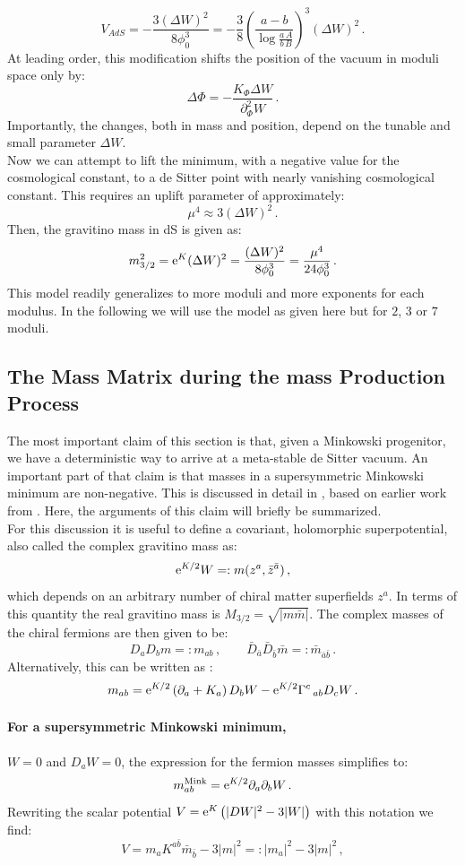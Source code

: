 \documentclass[a4paper,12pt]{report}
\newcommand{\be}{\begin{equation}}
\newcommand{\ee}{\end{equation}}
\def\rme{{\rm e}}
\begin{document}
\be 
V_{AdS} = - \frac{3(\Delta W)^2}{8 \phi_0^3} = -\frac{3}{8} \left(\frac{a-b}{\log \frac{a\, A}{b\,B}}\right)^3 (\Delta W)^2\,.
\ee
At leading order, this modification shifts the position of the vacuum in moduli space only by:
\be 
\Delta \Phi = - \frac{K_\Phi \Delta W}{\partial_\Phi^2 W}\,.
\ee
Importantly, the changes, both in mass and position, depend on the tunable and small parameter $\Delta W$.\\
Now we can attempt to lift the minimum, with a negative value for the cosmological constant, to a de Sitter point with nearly vanishing cosmological constant. This requires an uplift parameter of approximately:
\be 
\mu^4 \approx 3 (\Delta W)^2\,.
\ee
Then, the gravitino mass in dS is given as:
\be 
m_{3/2}^2 = \rme^K (\Delta W)^2 = \frac{(\Delta W)^2}{8 \phi_0^3} =  \frac{\mu^4}{24\phi_0^3}\,.
\ee
This model readily generalizes to more moduli and more exponents for each modulus. In the following we will use the model as given here but for $2$, $3$ or $7$ moduli.

\subsection{The Mass Matrix during the mass Production Process}
\label{sec:massmass}
The most important claim of this section is that, given a Minkowski progenitor, we have a deterministic way to arrive at a meta-stable de Sitter vacuum. An important part of that claim is that masses in a supersymmetric Minkowski minimum are non-negative. This is discussed in detail in \cite{Kallosh:2019zgd}, based on earlier work from \cite{BlancoPillado:2005fn}. Here, the arguments of this claim will briefly be summarized.\\
For this discussion it is useful to define a covariant, holomorphic superpotential, also called the complex gravitino mass as:
\be 
\rme^{K/2} W =: m(z^a,\bar{z}^{\bar{a}})\,,
\ee
which depends on an arbitrary number of chiral matter superfields $z^a$. In terms of this quantity the real gravitino mass is $M_{3/2} = \sqrt{|m\bar{m}|}$. The complex masses of the chiral fermions are then given to be:
\be 
D_a D_b m =: m_{ab}\,,\qquad \bar{D}_{\bar{a}}\bar{D}_{\bar{b}}\bar{m} =: \bar{m}_{\bar{a}\bar{b}}\,.
\ee
Alternatively, this can be written as \cite{Freedman:2012zz}:
\be 
m_{ab} = \rme^{K/2} \left(\partial_a + K_a\right) D_b W - \rme^{K/2} \Gamma^{c}\,_{ab} D_c W\,.
\ee
\paragraph{For a supersymmetric Minkowski minimum,} $W = 0$ and $D_aW=0$, the expression for the fermion masses simplifies to:
\be 
m_{ab}^{\text{Mink}} = \rme^{K/2} \partial_a \partial_b W\,.
\ee
Rewriting the scalar potential $V=\rme^K \left(|DW|^2 - 3 |W|\right)$ with this notation we find:
\be 
V = m_a K^{a\bar{b}}\bar{m}_{\bar{b}} - 3 |m|^2 =: |m_a|^2 - 3 |m|^2\,,
\ee
\end{document}
